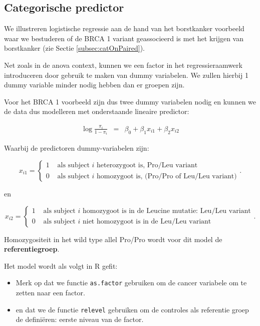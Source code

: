 \documentclass[
  12pt,dutch,coursenotes]{book}
\newcommand{\passthrough}[1]{#1}
\providecommand{\tightlist}{%
  \setlength{\itemsep}{0pt}\setlength{\parskip}{0pt}}
\begin{document}
\hypertarget{categorische-predictor}{%
\subsection{Categorische predictor}\label{categorische-predictor}}

We illustreren logistische regressie aan de hand van het borstkanker voorbeeld waar we bestuderen of de BRCA 1 variant geassocieerd is met het krijgen van borstkanker (zie Sectie \ref{subsec:catOnPaired}).

Net zoals in de anova context, kunnen we een factor in het regressieraamwerk introduceren door gebruik te maken van dummy variabelen.
We zullen hierbij 1 dummy variable minder nodig hebben dan er groepen zijn.

Voor het BRCA 1 voorbeeld zijn dus twee dummy variabelen nodig en kunnen we de data dus modelleren met onderstaande lineaire predictor:

\begin{eqnarray*}
  \log \frac{\pi_i}{1-\pi_i} &=& \beta_0+\beta_1 x_{i1} +\beta_2 x_{i2}
\end{eqnarray*}

Waarbij de predictoren dummy-variabelen zijn:

\[x_{i1} = \left\{ \begin{array}{ll}
1 & \text{ als subject $i$ heterozygoot is, Pro/Leu variant} \\
0 & \text{ als subject $i$ homozygoot is, (Pro/Pro of Leu/Leu variant)} \end{array}\right. .\]

en

\[x_{i2} = \left\{ \begin{array}{ll}
1 & \text{ als subject $i$ homozygoot is in de Leucine mutatie: Leu/Leu variant} \\
0 & \text{ als subject $i$ niet homozygoot is in de Leu/Leu variant} \end{array}\right. .\]

Homozygositeit in het wild type allel Pro/Pro wordt voor dit model de \textbf{referentiegroep}.

Het model wordt als volgt in R gefit:

\begin{itemize}
\tightlist
\item
  Merk op dat we functie \passthrough{\lstinline!as.factor!} gebruiken om de cancer variabele om te zetten naar een factor.
\item
  en dat we de functie \passthrough{\lstinline!relevel!} gebruiken om de controles als referentie groep de definiëren: eerste niveau van de factor.
\end{itemize}
\end{document}
